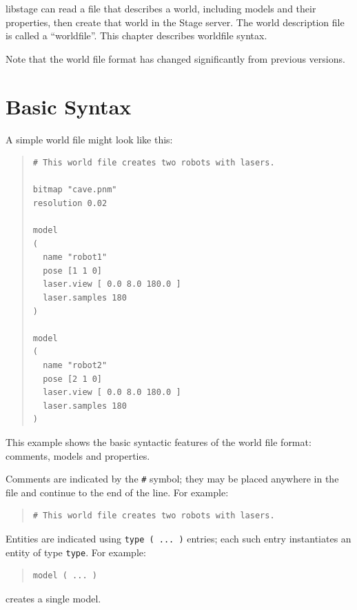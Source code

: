 \documentclass[letter,11pt,twoside]{report}
\begin{document}
libstage can read a file that describes a world, including models and
their properties, then create that world in the Stage server. The
world description file is called a ``worldfile''. This chapter
describes worldfile syntax.

Note that the world file format has changed significantly from
previous versions.

\section{Basic Syntax}

A simple world file might look like this:
\begin{quote}
\begin{verbatim}
# This world file creates two robots with lasers.

bitmap "cave.pnm" 
resolution 0.02

model
( 
  name "robot1" 
  pose [1 1 0] 
  laser.view [ 0.0 8.0 180.0 ]	
  laser.samples 180
)

model
( 
  name "robot2" 
  pose [2 1 0] 
  laser.view [ 0.0 8.0 180.0 ]	
  laser.samples 180
)
\end{verbatim}
\end{quote}
This example shows the basic syntactic features of the 
world file format: comments, models and properties.

Comments are indicated by the \verb'#' symbol; they may be placed
anywhere in the file and continue to the end of the line.  For
example:
\begin{quote}
\begin{verbatim}
# This world file creates two robots with lasers.
\end{verbatim}
\end{quote}
%
Entities are indicated using \verb'type ( ... )' entries; each such
entry instantiates an entity of type \verb'type'.  For example:
\begin{quote}
\begin{verbatim}
model ( ... )
\end{verbatim}
\end{quote}
creates a single model. 

\end{document}
